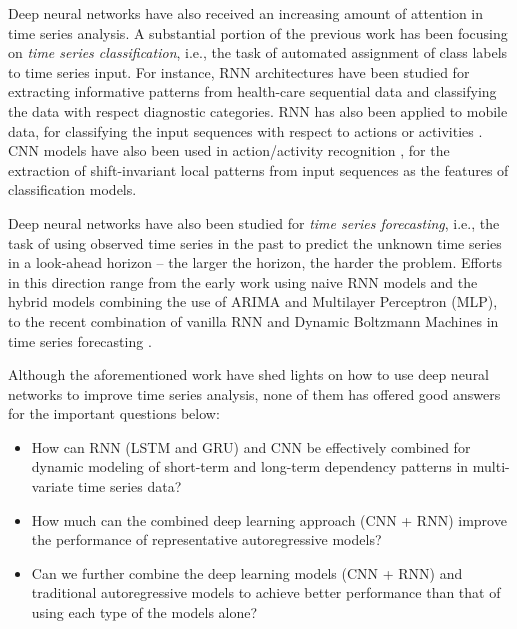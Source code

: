 Deep neural networks have also received an increasing amount of attention in time series analysis. A substantial portion of the previous work has been focusing on \textit{time series classification}, i.e., the task of automated assignment of class labels to time series input. For instance, RNN architectures have been studied for extracting informative patterns from health-care sequential data \cite{lipton2015learning,che2016recurrent} and classifying the data with respect diagnostic categories.  RNN has also been applied to mobile data, for classifying the input sequences with respect to actions or activities \cite{hammerla2016deep}. CNN models have also been used in action/activity recognition \cite{lea2016temporal,yang2015deep,hammerla2016deep}, for the extraction of shift-invariant local patterns from input sequences as the features of classification models.

Deep neural networks have also been studied for \textit{time series forecasting}, i.e., the task of using observed time series in the past to predict the unknown time series in a look-ahead horizon -- the larger the horizon, the harder the problem. Efforts in this direction range from the early work using naive RNN models \cite{connor1991recurrent} and the hybrid models \cite{zhang1998forecasting,zhang2003time,jain2007hybrid} combining the use of ARIMA \cite{box1970distribution} and Multilayer Perceptron (MLP), to the recent combination of vanilla RNN and Dynamic Boltzmann Machines in time series forecasting \cite{dasgupta2016nonlinear}.

Although the aforementioned work have shed lights on how to use  deep neural networks to improve time series analysis, none of them has offered good answers for the important questions below:
\begin{itemize}
 \item How can RNN (LSTM and GRU) and CNN be effectively combined for dynamic modeling of short-term and long-term dependency patterns in multi-variate time series data?
 \item How much can the combined deep learning approach (CNN + RNN) improve the performance of representative autoregressive models? 
 \item Can we further combine the deep learning models (CNN + RNN) and traditional autoregressive models to achieve better performance than that of using each type of the models alone?
\end{itemize}  



